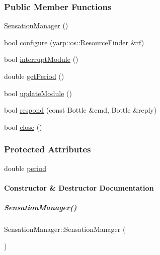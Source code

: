 \subsubsection*{Public Member Functions}
\begin{DoxyCompactItemize}
\item 
\hyperlink{group__sensationManager_a908b06fc7a13bd4efc8de99aa01d48d3}{Sensation\+Manager} ()
\item 
bool \hyperlink{group__sensationManager_ac005ae91278f6a5b2f93c472d364d99a}{configure} (yarp\+::os\+::\+Resource\+Finder \&rf)
\item 
bool \hyperlink{group__sensationManager_a8dc43f39792154ea23b5421d24e05cf1}{interrupt\+Module} ()
\item 
double \hyperlink{group__sensationManager_a09c431b25b3fabfafcefac5d7bea019b}{get\+Period} ()
\item 
bool \hyperlink{group__sensationManager_aa3d9294b7413c080bab7e516373e33ae}{update\+Module} ()
\item 
bool \hyperlink{group__sensationManager_a3df7a41b8c463ba9756d6910be0f64f2}{respond} (const Bottle \&cmd, Bottle \&reply)
\item 
bool \hyperlink{group__sensationManager_a7b02a2d08626e41d67825ebd14972760}{close} ()
\end{DoxyCompactItemize}
\subsubsection*{Protected Attributes}
\begin{DoxyCompactItemize}
\item 
double \hyperlink{group__sensationManager_accc331f6981ef5aed03e61203a3d801f}{period}
\end{DoxyCompactItemize}


\paragraph{Constructor \& Destructor Documentation}
\mbox{\label{group__sensationManager_a908b06fc7a13bd4efc8de99aa01d48d3}} 
\subparagraph{\texorpdfstring{Sensation\+Manager()}{SensationManager()}}
{\footnotesize\ttfamily Sensation\+Manager\+::\+Sensation\+Manager (\begin{DoxyParamCaption}{ }\end{DoxyParamCaption})\hspace{0.3cm}{\ttfamily [inline]}}



